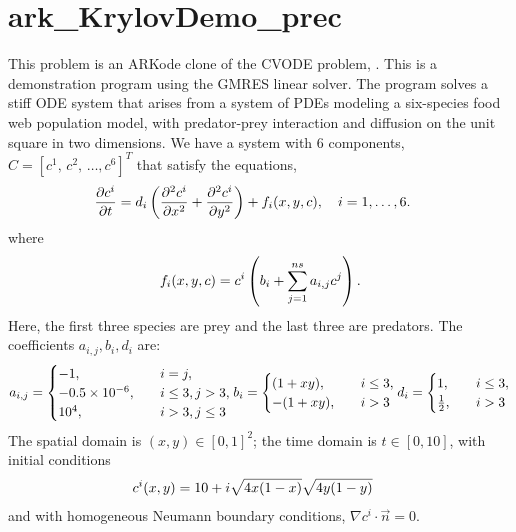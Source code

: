 \documentclass[letterpaper,10pt,english]{sphinxmanual}
\begin{document}
\chapter{ark\_KrylovDemo\_prec}
\label{ark_KrylovDemo_prec:ark-krylovdemo-prec}\label{ark_KrylovDemo_prec::doc}\label{ark_KrylovDemo_prec:id1}
This problem is an ARKode clone of the CVODE problem,
.  This is a demonstration program using the
GMRES linear solver.  The program solves a stiff ODE system that arises
from a system of PDEs modeling a six-species food web population
model, with predator-prey interaction and diffusion on the unit square
in two dimensions. We have a system with 6 components, $C =
[c^1,\, c^2,\,\ldots, c^6]^T$ that satisfy the equations,
\begin{gather}
\begin{split}\frac{\partial c^i}{\partial t} &= d_i \left(\frac{\partial^2 c^i}{\partial
   x^2} + \frac{\partial^2 c^i}{\partial y^2}\right) +
   f_i(x,y,c),\quad i=1,\ldots,6.\end{split}\notag
\end{gather}
where
\begin{gather}
\begin{split}f_i(x,y,c) = c^i\left( b_i + \sum_{j=1}^{ns} a_{i,j} c^j\right).\end{split}\notag
\end{gather}
Here, the first three species are prey and the last three are
predators.  The coefficients $a_{i,j}, b_i, d_i$ are:
\begin{gather}
\begin{split}a_{i,j} = \begin{cases}
            -1, \quad & i=j,\\
            -0.5\times10^{-6}, \quad & i\le 3, j>3, \\
             10^4, \quad & i>3, j\le3
          \end{cases}
b_i = \begin{cases}
         (1+xy), \quad & i\le 3,\\
        -(1+xy), \quad & i>3
      \end{cases}
d_i = \begin{cases}
         1, \quad & i\le 3,\\
         \frac12, \quad & i>3
      \end{cases}\end{split}\notag
\end{gather}
The spatial domain is $(x,y) \in [0, 1]^2$; the time domain is
$t \in [0,10]$, with initial conditions
\begin{gather}
\begin{split}c^i(x,y) &=  10 + i \sqrt{4x(1-x)}\sqrt{4y(1-y)}\end{split}\notag
\end{gather}
and with homogeneous Neumann boundary conditions,
$\nabla c^i \cdot \vec{n} = 0$.
\end{document}
